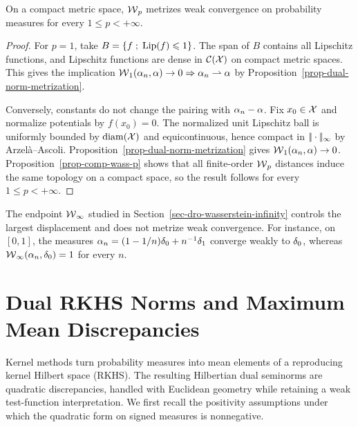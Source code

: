 \begin{cor}\label{cor-topol-wass}
	On a compact metric space, $\operatorname{\mathcal{W}}_p$ metrizes weak convergence on probability measures for every $1\leq p<+\infty$.
\end{cor}
\begin{proof}
	For $p=1$, take $B=\left\{ f \;;\; \operatorname{Lip}(f)\leqslant1 \right\}$. The span of $B$ contains all Lipschitz functions, and Lipschitz functions are dense in $\mathcal{C}(\mathcal{X})$ on compact metric spaces. This gives the implication $\operatorname{\mathcal{W}}_1(\alpha_n,\alpha)\to0\Rightarrow \alpha_n\rightharpoonup\alpha$ by Proposition~\ref{prop-dual-norm-metrization}.

	Conversely, constants do not change the pairing with $\alpha_n-\alpha$. Fix $x_0\in\mathcal{X}$ and normalize potentials by $f(x_0)=0$. The normalized unit Lipschitz ball is uniformly bounded by $\mathrm{diam}(\mathcal{X})$ and equicontinuous, hence compact in $|\!| \cdot |\!|_\infty$ by Arzel\`a--Ascoli. Proposition~\ref{prop-dual-norm-metrization} gives $\operatorname{\mathcal{W}}_1(\alpha_n,\alpha)\to0$. Proposition~\ref{prop-comp-wass-p} shows that all finite-order $\operatorname{\mathcal{W}}_p$ distances induce the same topology on a compact space, so the result follows for every $1\leq p<+\infty$.
\end{proof}
The endpoint $\operatorname{\mathcal{W}}_\infty$ studied in Section~\ref{sec-dro-wasserstein-infinity} controls the largest displacement and does not metrize weak convergence. For instance, on $[0,1]$, the measures $\alpha_n=(1-1/n)\delta_0+n^{-1}\delta_1$ converge weakly to $\delta_0$, whereas $\operatorname{\mathcal{W}}_\infty(\alpha_n,\delta_0)=1$ for every $n$.

\section{Dual RKHS Norms and Maximum Mean Discrepancies}
\label{sec-rkhs-mmd}

Kernel methods turn probability measures into mean elements of a reproducing kernel Hilbert space (RKHS). The resulting Hilbertian dual seminorms are quadratic discrepancies, handled with Euclidean geometry while retaining a weak test-function interpretation. We first recall the positivity assumptions under which the quadratic form on signed measures is nonnegative.

